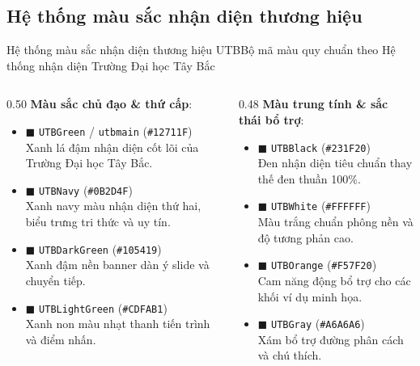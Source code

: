 \documentclass[aspectratio=169,10pt]{beamer}
\begin{document}
\subsection{Hệ thống màu sắc nhận diện thương hiệu}
\begin{frame}{Hệ thống màu sắc nhận diện thương hiệu UTB}{Bộ mã màu quy chuẩn theo Hệ thống nhận diện Trường Đại học Tây Bắc}
  \begin{columns}[T]
    \begin{column}{0.50\textwidth}
      \textbf{Màu sắc chủ đạo \& thứ cấp}:
      \begin{itemize}\setlength{\itemsep}{3pt}
        \item \textcolor{UTBGreen}{$\blacksquare$ \texttt{UTBGreen} / \texttt{utbmain}} (\texttt{\#12711F})\\
          \scriptsize Xanh lá đậm nhận diện cốt lõi của Trường Đại học Tây Bắc.
        \item \textcolor{UTBNavy}{$\blacksquare$ \texttt{UTBNavy}} (\texttt{\#0B2D4F})\\
          \scriptsize Xanh navy màu nhận diện thứ hai, biểu trưng tri thức và uy tín.
        \item \textcolor{UTBDarkGreen}{$\blacksquare$ \texttt{UTBDarkGreen}} (\texttt{\#105419})\\
          \scriptsize Xanh đậm nền banner dàn ý slide và chuyển tiếp.
        \item \textcolor{UTBLightGreen}{$\blacksquare$ \texttt{UTBLightGreen}} (\texttt{\#CDFAB1})\\
          \scriptsize Xanh non màu nhạt thanh tiến trình và điểm nhấn.
      \end{itemize}
    \end{column}

    \begin{column}{0.48\textwidth}
      \textbf{Màu trung tính \& sắc thái bổ trợ}:
      \begin{itemize}\setlength{\itemsep}{3pt}
        \item \textcolor{UTBBlack}{$\blacksquare$ \texttt{UTBBlack}} (\texttt{\#231F20})\\
          \scriptsize Đen nhận diện tiêu chuẩn thay thế đen thuần 100\%.
        \item \textcolor{UTBWhite}{$\blacksquare$ \texttt{UTBWhite}} (\texttt{\#FFFFFF})\\
          \scriptsize Màu trắng chuẩn phông nền và độ tương phản cao.
        \item \textcolor{UTBOrange}{$\blacksquare$ \texttt{UTBOrange}} (\texttt{\#F57F20})\\
          \scriptsize Cam năng động bổ trợ cho các khối ví dụ minh họa.
        \item \textcolor{UTBGray}{$\blacksquare$ \texttt{UTBGray}} (\texttt{\#A6A6A6})\\
          \scriptsize Xám bổ trợ đường phân cách và chú thích.
      \end{itemize}
    \end{column}
  \end{columns}
\end{frame}
\end{document}
